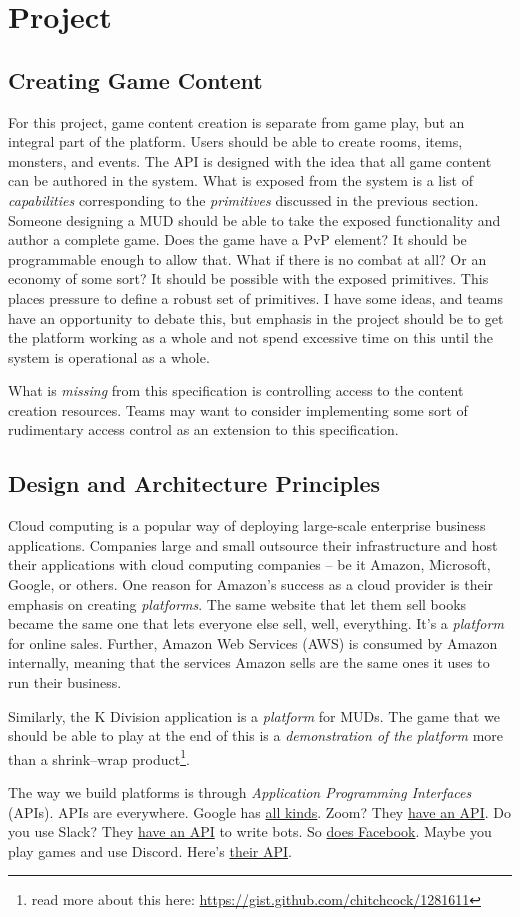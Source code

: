 \documentclass{article}
\newcommand{\enterProblemHeader}[1]{
}
\newcommand{\exitProblemHeader}[1]{
\nobreak\extramarks{#1}{}\nobreak
}
\newcounter{homeworkProblemCounter} %
\newcommand{\homeworkProblemName}{}
\newenvironment{homeworkProblem}[1][Problem \arabic{homeworkProblemCounter}]{ %
\stepcounter{homeworkProblemCounter} %
\renewcommand{\homeworkProblemName}{#1} %
\section{\homeworkProblemName} %
\enterProblemHeader{\homeworkProblemName} %
}{
\exitProblemHeader{\homeworkProblemName} %
}
\newcommand{\homeworkSectionName}{}
\newenvironment{homeworkSection}[1]{ %
\renewcommand{\homeworkSectionName}{#1} %
\subsection{\homeworkSectionName} %
\enterProblemHeader{\homeworkProblemName\ [\homeworkSectionName]} %
}{
\enterProblemHeader{\homeworkProblemName} %
}
\begin{document}
\begin{homeworkProblem}[Project]
\begin{homeworkSection}{Creating Game Content}
	For this project, game content creation is separate from game play, but an integral part of the platform. Users should be able to create rooms, items, monsters, and events. The API is designed with the idea that all game content can be authored in the system. What is exposed from the system is a list of \textit{capabilities} corresponding to the \textit{primitives} discussed in the previous section. Someone designing a MUD should be able to take the exposed functionality and author a complete game. Does the game have a PvP element? It should be programmable enough to allow that. What if there is no combat at all? Or an economy of some sort? It should be possible with the exposed primitives. This places pressure to define a robust set of primitives. I have some ideas, and teams have an opportunity to debate this, but emphasis in the project should be to get the platform working as a whole and not spend excessive time on this until the system is operational as a whole.
	
	What is \textit{missing} from this specification is controlling access to the content creation resources. Teams may want to consider implementing some sort of rudimentary access control as an extension to this specification.
\end{homeworkSection}

\begin{homeworkSection}{Design and Architecture Principles}
  Cloud computing is a popular way of deploying large-scale enterprise business applications. Companies large and small outsource their infrastructure and host their applications with cloud computing companies -- be it Amazon, Microsoft, Google, or others. One reason for Amazon's success as a cloud provider is their emphasis on creating \textit{platforms}. The same website that let them sell books became the same one that lets everyone else sell, well, everything. It's a \textit{platform} for online sales. Further, Amazon Web Services (AWS) is consumed by Amazon internally, meaning that the services Amazon sells are the same ones it uses to run their business.
  
  Similarly, the K Division application is a \textit{platform} for MUDs. The game that we should be able to play at the end of this is a \textit{demonstration of the platform} more than a shrink--wrap product\footnote{read more about this here: \url{https://gist.github.com/chitchcock/1281611}}.
  
  The way we build platforms is through \textit{Application Programming Interfaces} (APIs). APIs are everywhere. Google has \href{https://developers.google.com/apis-explorer}{all kinds}. Zoom? They \href{https://marketplace.zoom.us/docs/api-reference/zoom-api}{have an API}. Do you use Slack? They \href{https://api.slack.com/}{have an API} to write bots. So \href{https://developers.facebook.com/}{does Facebook}. Maybe you play games and use Discord. Here's \href{https://discord.com/developers/docs/intro}{their API}.
  

\end{homeworkSection}
\end{homeworkProblem}
\end{document}
